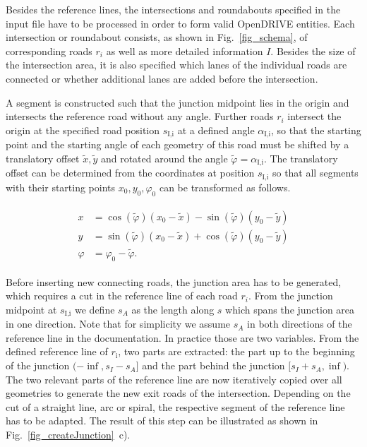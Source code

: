 \documentclass[a4paper, 10pt, conference]{ieeeconf}      %
\begin{document}
    Besides the reference lines, the intersections and roundabouts specified in the input file have to be processed in order to form valid OpenDRIVE entities. Each intersection or roundabout consists, as shown in Fig.~\ref{fig_schema}, of corresponding roads \(r_i\) as well as more detailed information \(I\). Besides the size of the intersection area, it is also specified which lanes of the individual roads are connected or whether additional lanes are added before the intersection.

    A segment is constructed such that the junction midpoint lies in the origin and intersects the reference road without any angle. Further roads \(r_i\) intersect the origin at the specified road position \(s_\text{I,i}\) at a defined angle \(\alpha_\text{I,i}\), so that the starting point and the starting angle of each geometry of this road must be shifted by a translatory offset \(\tilde{x}, \tilde{y}\) and rotated around the angle \(\tilde{\varphi} = \alpha_\text{I,i}\). The translatory offset can be determined from the coordinates at position \(s_\text{I,i}\) so that all segments with their starting points \(x_0,y_0,\varphi_0\) can be transformed as follows.

    \begin{align} \label{eq_transform}
        \begin{split}
            x &= \cos(\tilde{\varphi}) \left(x_0-\tilde{x}\right) - \sin(\tilde{\varphi}) \left(y_0-\tilde{y}\right) \\
            y &= \sin(\tilde{\varphi}) \left(x_0-\tilde{x}\right) + \cos(\tilde{\varphi}) \left(y_0-\tilde{y}\right) \\
            \varphi &= \varphi_0 - \tilde{\varphi} \text{.} 
        \end{split}
    \end{align}

    Before inserting new connecting roads, the junction area has to be generated, which requires a cut in the reference line of each road $r_i$. From the junction midpoint at \(s_\text{I,i}\) we define \(s_A\) as the length along $s$ which spans the junction area in one direction. Note that for simplicity we assume \(s_A\) in both directions of the reference line in the documentation. In practice those are two variables. From the defined reference line of $r_\text{i}$, two parts are extracted: the part up to the beginning of the junction \((-\inf,s_I - s_A]\) and the part behind the junction \([s_I + s_A, \inf)\). The two relevant parts of the reference line are now iteratively copied over all geometries to generate the new exit roads of the intersection. Depending on the cut of a straight line, arc or spiral, the respective segment of the reference line has to be adapted. The result of this step can be illustrated as shown in Fig.~\ref{fig_createJunction}~c).
    
\end{document}
